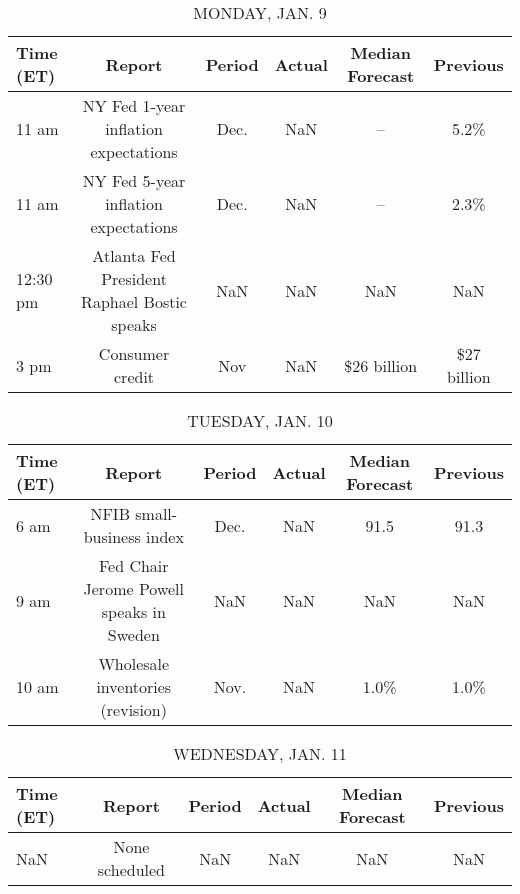\documentclass{article}%
\begin{document}
%
\normalsize%


\begin{table}[htbp]%
\caption{MONDAY, JAN. 9}%
\centering%
\begin{adjustbox}{width=1\textwidth}%
\begin{tabular}{lccccc}
\toprule
Time (ET) &                                      Report & Period & Actual & Median Forecast &    Previous \\
\midrule
    11 am &        NY Fed 1-year inflation expectations &   Dec. &    NaN &              -- &        5.2\% \\
    11 am &        NY Fed 5-year inflation expectations &   Dec. &    NaN &              -- &        2.3\% \\
 12:30 pm & Atlanta Fed President Raphael Bostic speaks &    NaN &    NaN &             NaN &         NaN \\
     3 pm &                             Consumer credit &    Nov &    NaN &     \$26 billion & \$27 billion \\
\bottomrule
\end{tabular}
%
\end{adjustbox}%
\end{table}

%


\begin{table}[htbp]%
\caption{TUESDAY, JAN. 10}%
\centering%
\begin{adjustbox}{width=1\textwidth}%
\begin{tabular}{lccccc}
\toprule
Time (ET) &                                   Report & Period & Actual & Median Forecast & Previous \\
\midrule
     6 am &                NFIB small-business index &   Dec. &    NaN &            91.5 &     91.3 \\
     9 am & Fed Chair Jerome Powell speaks in Sweden &    NaN &    NaN &             NaN &      NaN \\
    10 am &         Wholesale inventories (revision) &   Nov. &    NaN &            1.0\% &     1.0\% \\
\bottomrule
\end{tabular}
%
\end{adjustbox}%
\end{table}

%


\begin{table}[htbp]%
\caption{WEDNESDAY, JAN. 11}%
\centering%
\begin{adjustbox}{width=1\textwidth}%
\begin{tabular}{lccccc}
\toprule
Time (ET) &         Report & Period & Actual & Median Forecast & Previous \\
\midrule
      NaN & None scheduled &    NaN &    NaN &             NaN &      NaN \\
\bottomrule
\end{tabular}
%
\end{adjustbox}%
\end{table}
\end{document}
